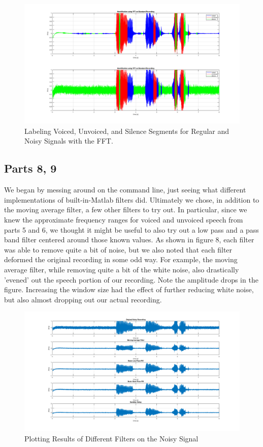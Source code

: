\documentclass[11pt]{article}
\begin{document}
\begin{figure}[H]
  \centering
  \includegraphics[scale=.25]{part_7_attempt.png}
  \caption{Labeling Voiced, Unvoiced, and Silence Segments for Regular and Noisy Signals with the FFT.}
\end{figure}


\subsection{Parts 8, 9}
We began by messing around on the command line, just seeing what different implementations of built-in-Matlab filters did. Ultimately we chose, in addition to the moving average filter, a few other filters to try out. In particular, since we knew the approximate frequency ranges for voiced and unvoiced speech from parts 5 and 6, we thought it might be useful to also try out a low pass and a pass band filter centered around those known values. As shown in figure 8, each filter was able to remove quite a bit of noise, but we also noted that each filter deformed the original recording in some odd way. For example, the moving average filter, while removing quite a bit of the white noise, also drastically 'evened' out the speech portion of our recording. Note the amplitude drops in the figure. Increasing the window size had the effect of further reducing white noise, but also almost dropping out our actual recording.
\begin{figure}[H]
  \centering
  \includegraphics[scale=.25]{part_8_filter_visuals.png}
  \caption{Plotting Results of Different Filters on the Noisy Signal}
\end{figure}
\end{document}
